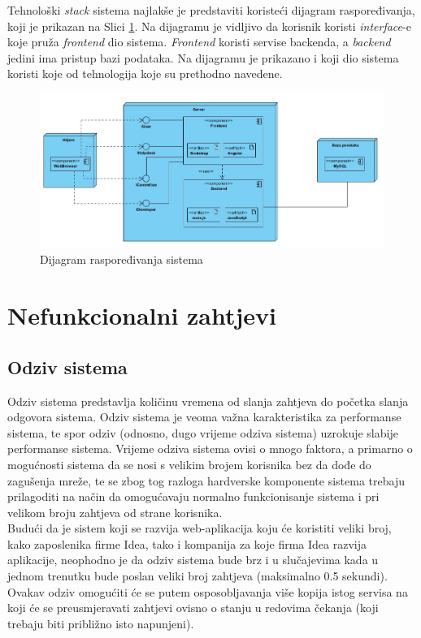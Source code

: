 \documentclass[12pt,a4paper]{article}
\begin{document}
Tehnološki \textit{stack} sistema najlakše je predstaviti koristeći dijagram raspoređivanja, koji je prikazan na Slici \ref{deployment}. Na dijagramu je vidljivo da korisnik koristi \textit{interface}-e koje pruža \textit{frontend} dio sistema. \textit{Frontend} koristi servise backenda, a \textit{backend} jedini ima pristup bazi podataka. Na dijagramu je prikazano i koji dio sistema koristi koje od tehnologija koje su prethodno navedene.

\begin{figure}[H]
\center
\includegraphics[scale=0.55]{../res/deployment.JPG}
\caption{Dijagram raspoređivanja sistema}
\label{deployment}
\end{figure}

\newpage

\section{Nefunkcionalni zahtjevi}

\subsection{Odziv sistema}

\quad Odziv sistema predstavlja količinu vremena od slanja zahtjeva do početka slanja odgovora sistema. Odziv sistema je veoma važna karakteristika za performanse sistema, te spor odziv (odnosno, dugo vrijeme odziva sistema) uzrokuje slabije performanse sistema. Vrijeme odziva sistema ovisi o mnogo faktora, a primarno o mogućnosti sistema da se nosi s velikim brojem korisnika bez da dođe do zagušenja mreže, te se zbog tog razloga hardverske komponente sistema trebaju prilagoditi na način da omogućavaju normalno funkcionisanje sistema i pri velikom broju zahtjeva od strane korisnika. \\

Budući da je sistem koji se razvija web-aplikacija koju će koristiti veliki broj, kako zaposlenika firme Idea, tako i kompanija za koje firma Idea razvija aplikacije, neophodno je da odziv sistema bude brz i u slučajevima kada u jednom trenutku bude poslan veliki broj zahtjeva (maksimalno 0.5 sekundi). Ovakav odziv omogućiti će se putem osposobljavanja više kopija istog servisa na koji će se preusmjeravati zahtjevi ovisno o stanju u redovima čekanja (koji trebaju biti približno isto napunjeni).
\end{document}
